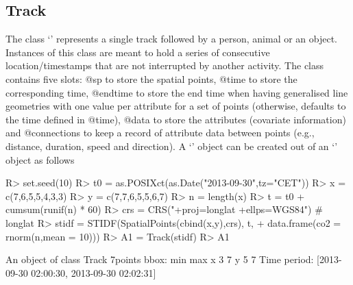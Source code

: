 \documentclass[article]{jss}
\newcommand{\class}[1]{`\code{#1}'}
\begin{document}
\subsection{Track}
The class \class{Track} represents a single track followed by a person, animal or an object. Instances of this class are meant to hold a series of consecutive location/timestamps that are not interrupted by another activity. The class contains five slots: @sp to store the spatial points, @time to store the corresponding time, @endtime to store the end time when having generalised line geometries with one value per attribute for a set of points (otherwise, defaults to the time defined in @time), @data to store the attributes (covariate information) and @connections to keep a record of attribute data between points (e.g., distance, duration, speed and direction). A \class{Track} object can be created out of an \class{STIDF} object as follows
\begin{Schunk}
\begin{Sinput}
R> set.seed(10)
R> t0 = as.POSIXct(as.Date("2013-09-30",tz="CET"))
R> x = c(7,6,5,5,4,3,3)
R> y = c(7,7,6,5,5,6,7)
R> n = length(x)
R> t = t0 + cumsum(runif(n) * 60)
R> crs = CRS("+proj=longlat +ellps=WGS84") # longlat
R> stidf = STIDF(SpatialPoints(cbind(x,y),crs), t, 
+                  data.frame(co2 = rnorm(n,mean = 10)))
R> A1 = Track(stidf)
R> A1
\end{Sinput}
\begin{Soutput}
An object of class Track 
7points 
bbox: 
  min max
x   3   7
y   5   7
Time period: [2013-09-30 02:00:30, 2013-09-30 02:02:31]
\end{Soutput}
\end{Schunk}
\end{document}
